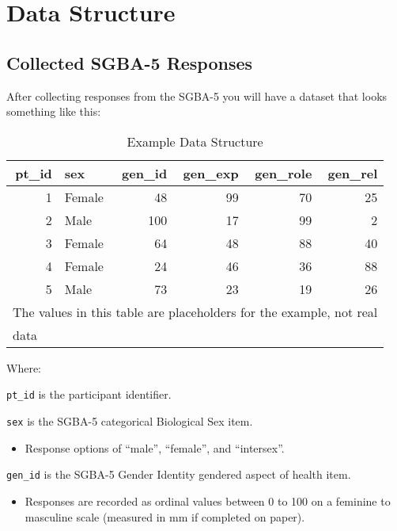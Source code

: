 \documentclass[
]{book}
\providecommand{\tightlist}{%
  \setlength{\itemsep}{0pt}\setlength{\parskip}{0pt}}
\begin{document}
\chapter{Data Structure}\label{data-structure}

\section{Collected SGBA-5 Responses}\label{collected-sgba-5-responses}

After collecting responses from the SGBA-5 you will have a dataset that looks something like this:

\begin{table}

\caption{\label{tab:01-example-table}Example Data Structure}
\centering
\begin{tabular}[t]{rlrrrr}
\toprule
pt\_id & sex & gen\_id & gen\_exp & gen\_role & gen\_rel\\
\midrule
1 & Female & 48 & 99 & 70 & 25\\
2 & Male & 100 & 17 & 99 & 2\\
3 & Female & 64 & 48 & 88 & 40\\
4 & Female & 24 & 46 & 36 & 88\\
5 & Male & 73 & 23 & 19 & 26\\
\bottomrule
\multicolumn{6}{l}{\textsuperscript{} The values in this table are placeholders for the example, not real}\\
\multicolumn{6}{l}{data}\\
\end{tabular}
\end{table}

Where:

\texttt{pt\_id} is the participant identifier.

\texttt{sex} is the SGBA-5 categorical Biological Sex item.

\begin{itemize}
\tightlist
\item
  Response options of ``male'', ``female'', and ``intersex''.
\end{itemize}

\texttt{gen\_id} is the SGBA-5 Gender Identity gendered aspect of health item.

\begin{itemize}
\tightlist
\item
  Responses are recorded as ordinal values between 0 to 100 on a feminine to masculine scale (measured in mm if completed on paper).
\end{itemize}
\end{document}
